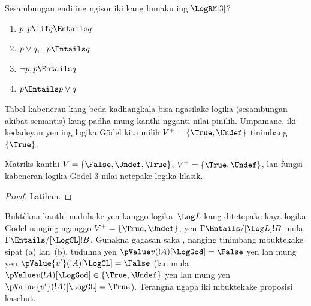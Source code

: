 \documentclass[../../../include/open-logic-section]{subfiles}
\begin{document}
\begin{prob}
  Sesambungan endi ing ngisor iki kang lumaku ing $\LogRM[3]$?
  \begin{enumerate}
    \item $p, p \lif q \Entails q$
    \item $p \lor q, \lnot p \Entails q$
    \item $\lnot p, p \Entails q$
    \item $p \Entails p \lor q$
  \end{enumerate}
\end{prob}

Tabel kabeneran kang beda kadhangkala bisa ngasilake logika
(sesambungan akibat semantis) kang padha mung kanthi ngganti nilai
pinilih. Umpamane, iki kedadeyan yen ing logika G\"odel kita
milih $V^+ = \{\True, \Undef\}$ tinimbang~$\{\True\}$.

\begin{prop}
  Matriks kanthi $V = \{\False, \Undef,\True\}$, $V^+=\{\True,
  \Undef\}$, lan fungsi kabeneran logika G\"odel $3$ nilai
  netepake logika klasik.
\end{prop}

\begin{proof}
  Latihan.
\end{proof}

\begin{prob}
  Buktèkna  kanthi nuduhake yen
  kanggo logika~$\Log L$ kang ditetepake kaya logika G\"odel nanging
  nganggo $V^+=\{\True,\Undef\}$, yen $\Gamma \Entails/[\Log L]
  !B$ mula $\Gamma \Entails/[\LogCL] !B$. Gunakna gagasan saka
  , nanging tinimbang mbuktekake
  sipat (a) lan~(b), tuduhna yen $\pValue v(!A)[\LogGod] = \False$
  yen lan mung yen $\pValue {v'}(!A)[\LogCL] = \False$ (lan mula
  $\pValue v(!A)[\LogGod] \in \{\True,\Undef\}$ yen lan mung yen
  $\pValue {v'}(!A)[\LogCL] = \True$). Terangna ngapa iki
  mbuktekake proposisi kasebut.
\end{prob}
\end{document}
